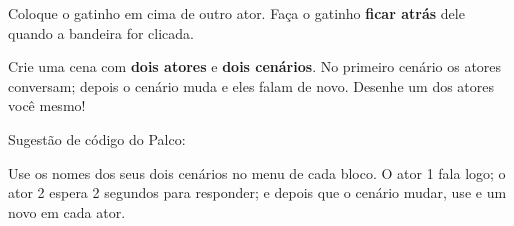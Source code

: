 \begin{exercicio}
Coloque o gatinho em cima de outro ator. Faça o gatinho \textbf{ficar atrás} dele quando a bandeira for clicada.
\end{exercicio}

\begin{solucao}
\begin{pilha}
\end{pilha}
\end{solucao}

\begin{desafio}
Crie uma cena com \textbf{dois atores} e \textbf{dois cenários}. No primeiro cenário os atores conversam; depois o cenário muda e eles falam de novo. Desenhe um dos atores você mesmo!
\end{desafio}

\begin{solucao}
Sugestão de código do Palco:
\begin{pilha}
\end{pilha}
Use os nomes dos seus dois cenários no menu de cada bloco.
O ator 1 fala logo; o ator 2 espera 2 segundos para responder; e depois que o cenário mudar, use  e um novo  em cada ator.
\end{solucao}
